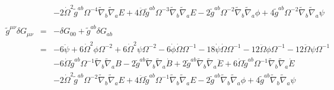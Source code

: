 \documentclass[10pt,letterpaper]{article}
\numberwithin{equation}{section}
\begin{document}
\begin{eqnarray}
&& - 2 \dot{\Omega}^2 \tilde{g}^{ab} \Omega^{-4} \tilde{\nabla}_{b}\tilde{\nabla}_{a}E
+ 4 \ddot{\Omega} \tilde{g}^{ab} \Omega^{-3} \tilde{\nabla}_{b}\tilde{\nabla}_{a}E
- 2 \tilde{g}^{ab} \Omega^{-2} \tilde{\nabla}_{b}\tilde{\nabla}_{a}\phi
+ 4 \tilde{g}^{ab} \Omega^{-2} \tilde{\nabla}_{b}\tilde{\nabla}_{a}\psi
\\ \nonumber\\
\tilde g^{\mu\nu}\delta G_{\mu\nu}&=& -\delta G_{00} + \tilde g^{ab}\delta G_{ab}
\nonumber\\
&=&-6 \ddot{\psi}
+ 6 \dot{\Omega}^2 \phi \Omega^{-2}
+ 6 \dot{\Omega}^2 \psi \Omega^{-2}
- 6 \dot{\phi} \dot{\Omega} \Omega^{-1}
- 18 \dot{\psi} \dot{\Omega} \Omega^{-1}
- 12 \ddot{\Omega} \phi \Omega^{-1}
- 12 \ddot{\Omega} \psi \Omega^{-1}\nonumber\\
&& - 6 \dot{\Omega} \tilde{g}^{ab} \Omega^{-1} \tilde{\nabla}_{b}\tilde{\nabla}_{a}B
- 2 \tilde{g}^{ab} \tilde{\nabla}_{b}\tilde{\nabla}_{a}\dot{B}
+ 2 \tilde{g}^{ab} \tilde{\nabla}_{b}\tilde{\nabla}_{a}\ddot{E}
+ 6 \dot{\Omega} \tilde{g}^{ab} \Omega^{-1} \tilde{\nabla}_{b}\tilde{\nabla}_{a}\dot{E}\nonumber\\
&& - 2 \dot{\Omega}^2 \tilde{g}^{ab} \Omega^{-2} \tilde{\nabla}_{b}\tilde{\nabla}_{a}E
+ 4 \ddot{\Omega} \tilde{g}^{ab} \Omega^{-1} \tilde{\nabla}_{b}\tilde{\nabla}_{a}E
- 2 \tilde{g}^{ab} \tilde{\nabla}_{b}\tilde{\nabla}_{a}\phi
+ 4 \tilde{g}^{ab} \tilde{\nabla}_{b}\tilde{\nabla}_{a}\psi
\end{eqnarray}


\end{document}
